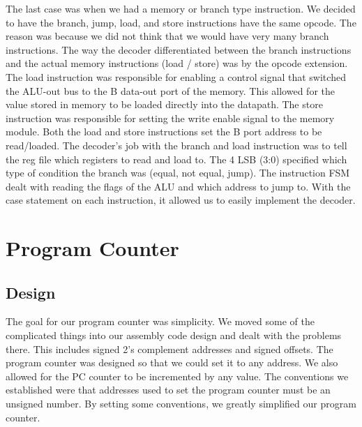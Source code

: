 \documentclass[11pt]{article}
\begin{document}
The last case was when we had a memory or branch type instruction. We decided to have the branch, jump, load, and store instructions have the same opcode. The reason was because we did not think that we would have very many branch instructions. The way the decoder differentiated between the branch instructions and the actual memory instructions (load / store) was by the opcode extension. The load instruction was responsible for enabling a control signal that switched the ALU-out bus to the B data-out port of the memory. This allowed for the value stored in memory to be loaded directly into the datapath. The store instruction was responsible for setting the write enable signal to the memory module. Both the load and store instructions set the B port address to be read/loaded. The decoder’s job with the branch and load instruction was to tell the reg file which registers to read and load to. The 4 LSB (3:0) specified which type of condition the branch was (equal, not equal, jump). The instruction FSM dealt with reading the flags of the ALU and which address to jump to. With the case statement on each instruction, it allowed us to easily implement the decoder.



\section{Program Counter}
\subsection{Design}
The goal for our program counter was simplicity. We moved some of the complicated things into our assembly code design and dealt with the problems there. This includes signed 2’s complement addresses and signed offsets. The program counter was designed so that we could set it to any address. We also allowed for the PC counter to be incremented by any value. The conventions we established were that addresses used to set the program counter must be an unsigned number. By setting some conventions, we greatly simplified our program counter.
\end{document}
